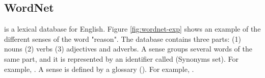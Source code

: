 \documentclass{KBook}
\begin{document}
\subsection{WordNet}

 \cite{1995-miller} is a lexical database for English.
Figure \ref{fig:wordnet-exp} shows an example of the different senses of the word "reason". The database contains three parts: (1) nouns (2) verbs (3) adjectives and adverbs. A sense groups several words of the same part, and it is represented by an identifier called  (Synonyms set). For example, . A sense is defined by a glossary (). For example, .
\end{document}
